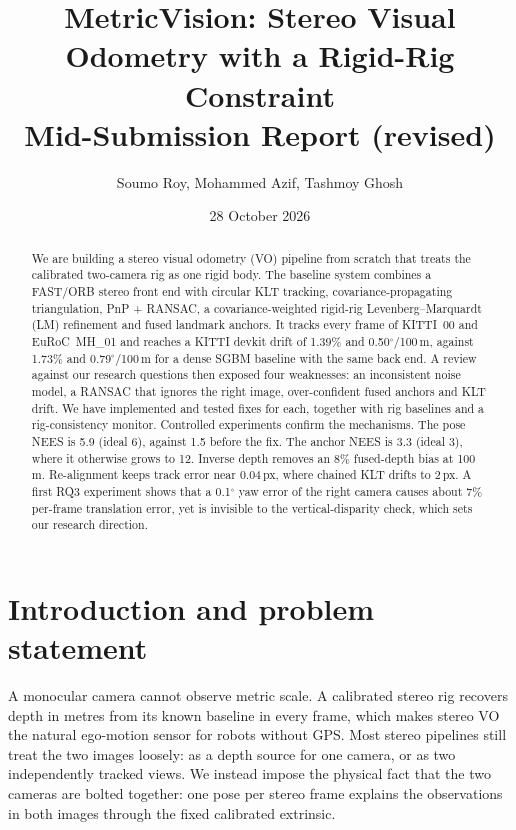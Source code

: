 \documentclass[11pt,a4paper]{article}
\title{\vspace{-1.2cm}MetricVision: Stereo Visual Odometry with a Rigid-Rig Constraint\\[2pt]\large Mid-Submission Report (revised)}
\author{Soumo Roy, Mohammed Azif, Tashmoy Ghosh}
\date{28 October 2026}
\begin{document}
\maketitle
\vspace{-0.7cm}

\begin{abstract}
\noindent We are building a stereo visual odometry (VO) pipeline from scratch that treats the calibrated two-camera rig as one rigid body. The baseline system combines a FAST/ORB stereo front end with circular KLT tracking, covariance-propagating triangulation, PnP + RANSAC, a covariance-weighted rigid-rig Levenberg--Marquardt (LM) refinement and fused landmark anchors. It tracks every frame of KITTI~00 and EuRoC~MH\_01 and reaches a KITTI devkit drift of 1.39\% and 0.50$^\circ$/100\,m, against 1.73\% and 0.79$^\circ$/100\,m for a dense SGBM baseline with the same back end. A review against our research questions then exposed four weaknesses: an inconsistent noise model, a RANSAC that ignores the right image, over-confident fused anchors and KLT drift. We have implemented and tested fixes for each, together with rig baselines and a rig-consistency monitor. Controlled experiments confirm the mechanisms. The pose NEES is 5.9 (ideal 6), against 1.5 before the fix. The anchor NEES is 3.3 (ideal 3), where it otherwise grows to 12. Inverse depth removes an 8\% fused-depth bias at 100\,m. Re-alignment keeps track error near 0.04\,px, where chained KLT drifts to 2\,px. A first RQ3 experiment shows that a 0.1$^\circ$ yaw error of the right camera causes about 7\% per-frame translation error, yet is invisible to the vertical-disparity check, which sets our research direction.
\end{abstract}

\section{Introduction and problem statement}\label{sec:problem}
A monocular camera cannot observe metric scale. A calibrated stereo rig recovers depth in metres from its known baseline in every frame, which makes stereo VO the natural ego-motion sensor for robots without GPS. Most stereo pipelines still treat the two images loosely: as a depth source for one camera, or as two independently tracked views. We instead impose the physical fact that the two cameras are bolted together: one pose per stereo frame explains the observations in both images through the fixed calibrated extrinsic.
\end{document}
